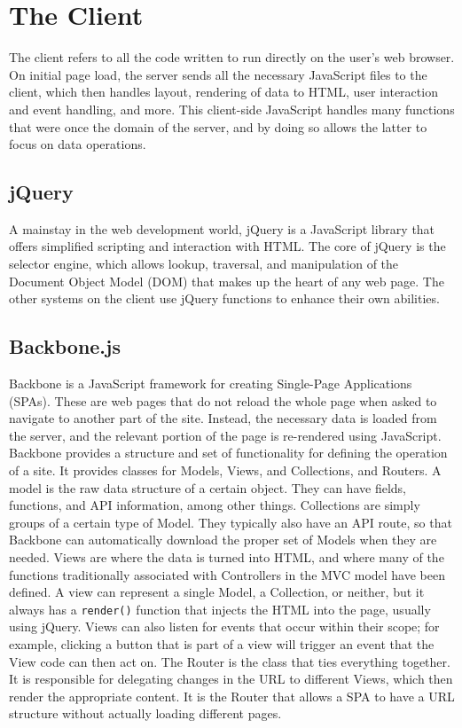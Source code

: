 \documentclass[12pt]{article}
\newcommand{\code}[1]{{\texttt {#1}}}
\begin{document}
\section{The Client}\label{sec:client}
The client refers to all the code written to run directly on the user's web browser. On initial page load, the server sends all the necessary JavaScript files to the client, which then handles layout, rendering of data to HTML, user interaction and event handling, and more. This client-side JavaScript handles many functions that were once the domain of the server, and by doing so allows the latter to focus on data operations.

\subsection{jQuery}\label{sec:jquery}
A mainstay in the web development world, jQuery is a JavaScript library that offers simplified scripting and interaction with HTML. The core of jQuery is the selector engine, which allows lookup, traversal, and manipulation of the Document Object Model (DOM) that makes up the heart of any web page. The other systems on the client use jQuery functions to enhance their own abilities.

\subsection{Backbone.js}\label{sec:backbone}
Backbone is a JavaScript framework for creating Single-Page Applications (SPAs). These are web pages that do not reload the whole page when asked to navigate to another part of the site. Instead, the necessary data is loaded from the server, and the relevant portion of the page is re-rendered using JavaScript. Backbone provides a structure and set of functionality for defining the operation of a site. It provides classes for Models, Views, and Collections, and Routers. A model is the raw data structure of a certain object. They can have fields, functions, and API information, among other things. Collections are simply groups of a certain type of Model. They typically also have an API route, so that Backbone can automatically download the proper set of Models when they are needed. Views are where the data is turned into HTML, and where many of the functions traditionally associated with Controllers in the MVC model have been defined. A view can represent a single Model, a Collection, or neither, but it always has a \code{render()} function that injects the HTML into the page, usually using jQuery. Views can also listen for events that occur within their scope; for example, clicking a button that is part of a view will trigger an event that the View code can then act on. The Router is the class that ties everything together. It is responsible for delegating changes in the URL to different Views, which then render the appropriate content. It is the Router that allows a SPA to have a URL structure without actually loading different pages.
\end{document}
